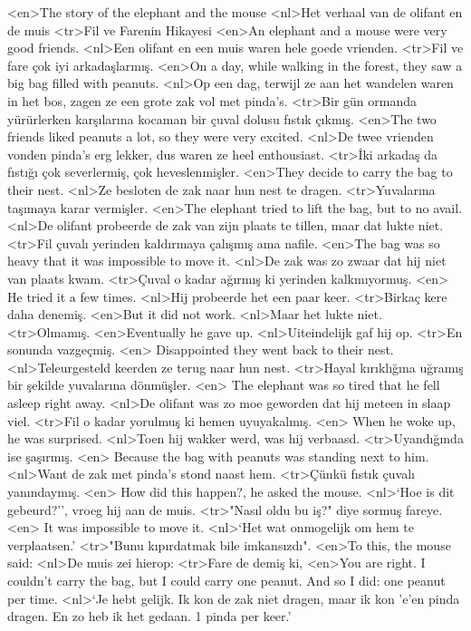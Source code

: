 <en>The story of the elephant and the mouse
<nl>Het verhaal van de olifant en de muis
<tr>Fil ve Farenin Hikayesi  
<en>An elephant and a mouse were very good friends.
<nl>Een olifant en een muis waren hele goede vrienden.  
<tr>Fil ve fare çok iyi arkadaşlarmış. 
<en>On a day, while walking in the forest, they saw a big bag filled with peanuts.
<nl>Op een dag, terwijl  ze aan het wandelen waren in het bos, zagen ze  een grote zak vol met pinda's. 
<tr>Bir gün ormanda yürürlerken karşılarına kocaman bir çuval dolusu fıstık çıkmış.
<en>The two friends liked peanuts a lot, so they were very excited.
<nl>De twee vrienden vonden pinda's erg  lekker, dus waren ze heel enthousiast. 
<tr>İki arkadaş da fıstığı çok severlermiş, çok heveslenmişler. 
<en>They decide to carry the bag to their nest.
<nl>Ze besloten de zak  naar hun nest te dragen. 
<tr>Yuvalarına taşımaya karar vermişler.  
<en>The elephant tried to lift the bag, but to no avail.
<nl>De olifant probeerde de zak van zijn plaats te tillen, maar dat lukte niet. 
<tr>Fil çuvalı yerinden kaldırmaya çalışmış ama nafile. 
<en>The bag was so heavy that it was impossible to move it.
<nl>De zak was zo zwaar dat hij niet van plaats kwam.
<tr>Çuval o kadar ağırmış ki yerinden kalkmıyormuş.
<en> He tried it a few times. 
<nl>Hij probeerde het een paar keer.
<tr>Birkaç kere daha denemiş. 
<en>But it did not work.
<nl>Maar het lukte niet. 
<tr>Olmamış. 
<en>Eventually he gave up.
<nl>Uiteindelijk gaf hij op. 
<tr>En sonunda vazgeçmiş.
<en> Disappointed they went back to their nest.
<nl>Teleurgesteld keerden ze terug naar hun nest.
<tr>Hayal kırıklığına uğramış bir şekilde yuvalarına dönmüşler. 
<en> The elephant was so tired that he fell asleep right away. 
<nl>De olifant was zo moe geworden dat hij meteen in slaap viel. 
<tr>Fil o kadar yorulmuş ki hemen uyuyakalmış.
<en> When he woke up, he was surprised.
<nl>Toen hij wakker werd, was hij verbaasd. 
<tr>Uyandığında ise şaşırmış. 
<en> Because the bag with peanuts was standing next to him.
<nl>Want de zak met pinda's stond naast hem. 
<tr>Çünkü fıstık çuvalı yanındaymış. 
<en> How did this happen?, he asked the mouse.
<nl>`Hoe is dit gebeurd?'', vroeg hij aan de muis.
<tr>"Nasıl oldu bu iş?" diye sormuş fareye.
<en> It was impossible to move it.
<nl>`Het wat onmogelijk om hem te verplaatsen.'
<tr>"Bunu kıpırdatmak bile imkansızdı".
<en>To this, the mouse said: 
<nl>De muis zei hierop: 
<tr>Fare de demiş ki, 
<en>You are right. I couldn't carry the bag, but I could carry one peanut. And so I did: one peanut per time.
<nl>`Je hebt gelijk. Ik kon de zak niet dragen, maar ik kon 'e'en pinda dragen. En zo heb ik het gedaan. 1 pinda per keer.' 
